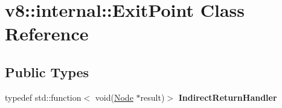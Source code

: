\hypertarget{classv8_1_1internal_1_1ExitPoint}{}\section{v8\+:\+:internal\+:\+:Exit\+Point Class Reference}
\label{classv8_1_1internal_1_1ExitPoint}
\subsection*{Public Types}
\begin{DoxyCompactItemize}
\item 
\mbox{\label{classv8_1_1internal_1_1ExitPoint_a91c0721fb5cf5df992262a745fab0034}} 
typedef std\+::function$<$ void(\mbox{\hyperlink{classv8_1_1internal_1_1compiler_1_1Node}{Node}} $\ast$result)$>$ {\bfseries Indirect\+Return\+Handler}
\end{DoxyCompactItemize}
